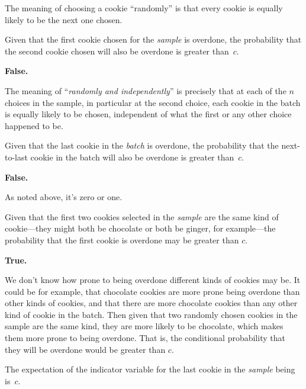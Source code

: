 \begin{problem}
\begin{solution}
The meaning of choosing a cookie ``randomly'' is that every cookie is
equally likely to be the next one chosen.
\end{solution}


\ppart Given that the first cookie chosen for the \emph{sample} is overdone,
the probability that the second cookie chosen will also be overdone is greater
than~$c$. 

\begin{solution}
\textbf{False.}

  The meaning of ``\emph{randomly and independently}'' is precisely
  that at each of the $n$ choices in the sample, in particular at the
  second choice, each cookie in the batch is equally likely to be
  chosen, independent of what the first or any other choice happened
  to be.
\end{solution}

\ppart  Given that the last cookie in the \emph{batch} is overdone, the
  probability that the next-to-last cookie in the batch will also be
  overdone is greater than~$c$. 

\begin{solution}
\textbf{False.}

  As noted above, it's zero or one.
\end{solution}

\ppart Given that the first two cookies selected in the \emph{sample}
  are the same kind of cookie---they might both be chocolate or both
  be ginger, for example---the probability that the first cookie is
  overdone may be greater than $c$.


\begin{solution}
\textbf{True.}

  We don't know how prone to being overdone different kinds of
  cookies may be.  It could be for example, that chocolate cookies are
  more prone being overdone than other kinds of cookies, and that
  there are more chocolate cookies than any other kind of cookie in
  the batch.  Then given that two randomly chosen cookies in the
  sample are the same kind, they are more likely to be chocolate,
  which makes them more prone to being overdone.  That is, the
  conditional probability that they will be overdone would be
  greater than $c$.
\end{solution}

\ppart  The expectation of the indicator variable for the last cookie in
  the \emph{sample} being  is~$c$.




\end{problem}
